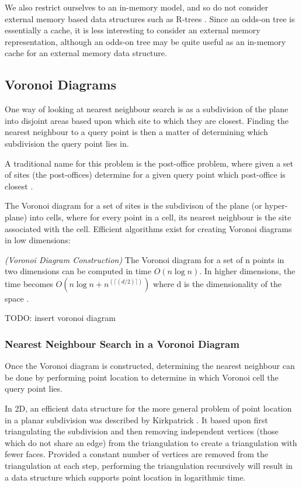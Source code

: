 \documentclass[mcs]{scsthesis}
\begin{document}
We also restrict ourselves to an in-memory model, and so do not consider
external memory based data structures such as R-trees \cite{rtree}. Since an
odds-on tree is essentially a cache, it is less interesting to consider an
external memory representation, although an odds-on tree may be quite useful
as an in-memory cache for an external memory data structure.

\subsection{Voronoi Diagrams}

One way of looking at nearest neighbour search is as a subdivision of the plane
into disjoint areas based upon which site to which they are closest. Finding
the nearest neighbour to a query point is then a matter of determining which
subdivision the query point lies in.

A traditional name for this problem is the post-office problem, where given a
set of sites (the post-offices) determine for a given query point which
post-office is closest \cite{dutch}.

The Voronoi diagram for a set of sites is the subdivison of the plane (or
hyper-plane) into cells, where for every point in a cell, its nearest neighbour
is the site associated with the cell. Efficient algorithms exist for creating
Voronoi diagrams in low dimensions:

\begin{thm} \emph{(Voronoi Diagram Construction)}
The Voronoi diagram for a set of n points in two dimensions can be computed
in time \(O(n \log n)\). In higher dimensions, the time becomes
\(O(n \log n + n^(\lceil(d/2)\rceil))\) where d is the dimensionality of the
space \cite{dutch}.
\end{thm}

TODO: insert voronoi diagram

\subsubsection{Nearest Neighbour Search in a Voronoi Diagram}

Once the Voronoi diagram is constructed, determining the nearest neighbour can
be done by performing point location to determine in which Voronoi cell the
query point lies.

In 2D, an efficient data structure for the more general problem of point
location in a planar subdivision was described by Kirkpatrick
\cite{kirkpatrick}. It based upon first triangulating the subdivision and then
removing independent vertices (those which do not share an edge) from the
triangulation to create a triangulation with fewer faces. Provided a constant
number of vertices are removed from the triangulation at each step, performing
the triangulation recursively will result in a data structure which supports
point location in logarithmic time.
\end{document}
